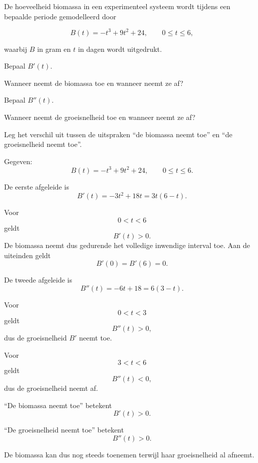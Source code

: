 \documentclass{ximera}
\begin{document}
\begin{oefening}{\oefU}

De hoeveelheid biomassa in een experimenteel systeem wordt tijdens
een bepaalde periode gemodelleerd door

\[
B(t)=-t^3+9t^2+24,
\qquad 0\leq t\leq 6,
\]

waarbij $B$ in gram en $t$ in dagen wordt uitgedrukt.

\begin{question}
Bepaal $B'(t)$.
\end{question}

\begin{question}
Wanneer neemt de biomassa toe en wanneer neemt ze af?
\end{question}

\begin{question}
Bepaal $B''(t)$.
\end{question}

\begin{question}
Wanneer neemt de groeisnelheid toe en wanneer neemt ze af?
\end{question}

\begin{question}
Leg het verschil uit tussen de uitspraken
``de biomassa neemt toe'' en
``de groeisnelheid neemt toe''.
\end{question}

\begin{oplossing}

Gegeven:
\[
B(t)=-t^3+9t^2+24,
\qquad 0\leq t\leq6.
\]

De eerste afgeleide is
\[
B'(t)=-3t^2+18t
=3t(6-t).
\]

Voor
\[
0<t<6
\]
geldt
\[
B'(t)>0.
\]
De biomassa neemt dus gedurende het volledige inwendige interval toe.
Aan de uiteinden geldt
\[
B'(0)=B'(6)=0.
\]

De tweede afgeleide is
\[
B''(t)=-6t+18
=6(3-t).
\]

Voor
\[
0<t<3
\]
geldt
\[
B''(t)>0,
\]
dus de groeisnelheid $B'$ neemt toe.

Voor
\[
3<t<6
\]
geldt
\[
B''(t)<0,
\]
dus de groeisnelheid neemt af.

``De biomassa neemt toe'' betekent
\[
B'(t)>0.
\]

``De groeisnelheid neemt toe'' betekent
\[
B''(t)>0.
\]

De biomassa kan dus nog steeds toenemen terwijl haar groeisnelheid al
afneemt.

\end{oplossing}

\end{oefening}
\end{document}
